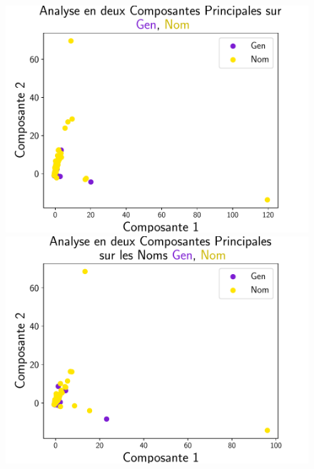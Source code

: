 \documentclass{cours}
\begin{document}
    \begin{figure}[H]
        \begin{center}
            \begin{minipage}{.5\textwidth}
                \begin{center}
                    \includegraphics[width=\linewidth]{Figures/Visualisations/pca_Gen_Nom}
                \end{center}
            \end{minipage}
        \end{center}
        \begin{minipage}{.5\textwidth}
            \begin{center}
                \includegraphics[width=\linewidth]{Figures/Visualisations/pca_Gen_Nom_Nouns}

\end{center}
\end{minipage}
\end{figure}
\end{document}
